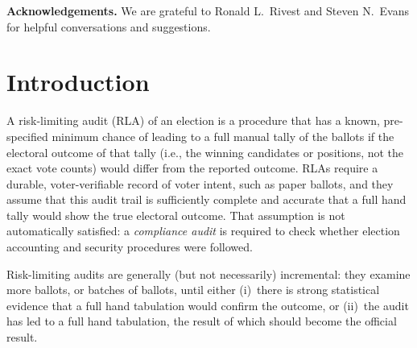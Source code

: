 \documentclass[runningheads]{llncs}
\begin{document}
\noindent
\textbf{Acknowledgements.}
We are grateful to Ronald L.~Rivest and Steven N.~Evans for helpful conversations and suggestions.

\section{Introduction}
A risk-limiting audit (RLA) of an election is a procedure that
has a known, pre-specified minimum chance of leading to a full manual tally of the ballots if the electoral outcome of that tally (i.e., the winning candidates or positions, not the exact vote counts) would differ from the
reported outcome. 
RLAs require a durable, voter-verifiable record of voter intent, such as paper ballots,
and they assume that this audit trail is sufficiently complete and accurate that a full hand
tally would show the true electoral outcome.
That assumption is not automatically satisfied: a \emph{compliance audit}
\cite{starkWagner12} 
is required to check whether election accounting and security procedures were followed.

Risk-limiting audits are generally (but not necessarily) incremental: they examine more ballots, or batches of ballots,
until either (i)~there is strong statistical evidence that a full hand tabulation would confirm the outcome,
or (ii)~the audit has led to a full hand tabulation, the result of which should become the official
result.


\end{document}
